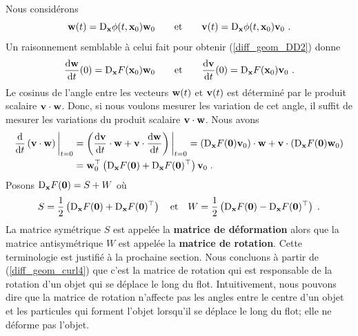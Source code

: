 {Nous considérons
\[
\VEC{w}(t) = \diff_{\VEC{x}}\phi(t,\VEC{x}_0) \VEC{w}_0
\qquad \text{et} \qquad
\VEC{v}(t) = \diff_{\VEC{x}}\phi(t,\VEC{x}_0) \VEC{v}_0 \ .
\]
Un raisonnement semblable à celui fait pour obtenir
(\ref{diff_geom_DD2}) donne
\[
\dydx{\VEC{w}}{t}(0) = \diff_{\VEC{x}} F(\VEC{x}_0) \VEC{w}_0
\qquad \text{et} \qquad 
\dydx{\VEC{v}}{t}(0) = \diff_{\VEC{x}} F(\VEC{x}_0) \VEC{v}_0 \ .
\]
Le cosinus de l'angle entre les vecteurs $\VEC{w}(t)$ et $\VEC{v}(t)$
est déterminé par le produit scalaire $\VEC{v} \cdot \VEC{w}$.  Donc,
si nous voulons mesurer les variation de cet angle, il suffit de mesurer
les variations du produit scalaire $\VEC{v} \cdot \VEC{w}$.  Nous
avons
\begin{align}
\dfdx{\left(\VEC{v}\cdot \VEC{w}\right)}{t}\bigg|_{t=0} &=
\left( \dydx{\VEC{v}}{t} \cdot \VEC{w}
+ \VEC{v} \cdot \dydx{\VEC{w}}{t} \right)\bigg|_{t=0}
= \left( \diff_{\VEC{x}} F(\VEC{0}) \VEC{v}_0 \right)\cdot \VEC{w}
+ \VEC{v} \cdot \left( \diff_{\VEC{x}} F(\VEC{0}) \VEC{w}_0 \right)
\nonumber \\
&= \VEC{w}_0^\top \left( \diff_{\VEC{x}} F(\VEC{0})
+ \diff_{\VEC{x}} F(\VEC{0})^\top \right) \VEC{v}_0
\; . \label{diff_geom_curl4}
\end{align}
Posons
$\DS \diff_{\VEC{x}} F(\VEC{0}) = S + W$ où 
\[
S = \frac{1}{2} \left( \diff_{\VEC{x}} F(\VEC{0}) +
\diff_{\VEC{x}} F(\VEC{0})^\top \right) \quad \text{et} \quad
W =
\frac{1}{2} \left( \diff_{\VEC{x}} F(\VEC{0})
- \diff_{\VEC{x}} F(\VEC{0})^\top \right)
\; .
\]
La matrice symétrique $S$ est appelée la {\bfseries matrice de
déformation} alors que
la matrice antisymétrique $W$ est appelée la {\bfseries matrice de
rotation}.  Cette terminologie est justifié
à la prochaine section.  Nous concluons à partir de
(\ref{diff_geom_curl4}) que c'est la matrice de rotation qui est
responsable de la rotation d'un objet qui se déplace le long du flot.
Intuitivement, nous pouvons dire que la matrice de rotation n'affecte pas
les angles entre le centre d'un objet et les particules qui forment
l'objet lorsqu'il se déplace le long du flot; elle ne déforme pas
l'objet.

}
